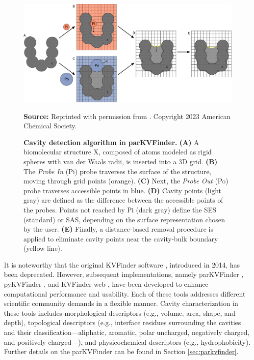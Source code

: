 \documentclass[Ingles]{phdthesis}
\def\eg{e.g.\onedot}
\begin{document}
\begin{figure}[h]
  \centerline{\includegraphics[scale=1]{images/kvfinder-suite-schema.png}}
  \centerline{\tiny{\textbf{Source:} Reprinted with permission from \cite{guerra2023B}. Copyright 2023 American Chemical Society.}}
  \caption[Cavity detection algorithm in parKVFinder]{\textbf{Cavity detection algorithm in parKVFinder.} \textbf{(A)} A biomolecular structure X, composed of atoms modeled as rigid spheres with van der Waals radii, is inserted into a 3D grid. \textbf{(B)} The \textit{Probe In} (Pi) probe traverses the surface of the structure, moving through grid points (orange). \textbf{(C)} Next, the \textit{Probe Out} (Po) probe traverses accessible points in blue. \textbf{(D)} Cavity points (light gray) are defined as the difference between the accessible points of the probes. Points not reached by Pi (dark gray) define the SES (standard) or SAS, depending on the surface representation chosen by the user. \textbf{(E)} Finally, a distance-based removal procedure is applied to eliminate cavity points near the cavity-bulk boundary (yellow line).}
  \label{fig:parkvfinder-schema}
\end{figure}

It is noteworthy that the original KVFinder software \cite{oliveira2014}, introduced in 2014, has been deprecated. However, subsequent implementations, namely parKVFinder \cite{guerra2020}, pyKVFinder \cite{guerra2021}, and KVFinder-web \cite{guerra2023A}, have been developed to enhance computational performance and usability. Each of these tools addresses different scientific community demands in a flexible manner. Cavity characterization in these tools includes morphological descriptors (\eg, volume, area, shape, and depth), topological descriptors (\eg, interface residues surrounding the cavities and their classification---aliphatic, aromatic, polar uncharged, negatively charged, and positively charged---), and physicochemical descriptors (\eg, hydrophobicity). Further details on the parKVFinder can be found in Section \ref{sec:parkvfinder}.
\end{document}
